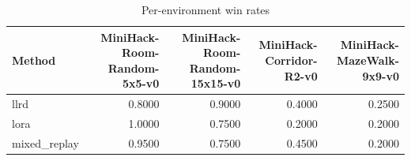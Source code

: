 \begin{table}[htbp]
\centering
\caption{Per-environment win rates}
\label{tab:per-env}
\begin{tabular}{lrrrr}
\toprule
\textbf{Method} & \textbf{MiniHack-Room-Random-5x5-v0} & \textbf{MiniHack-Room-Random-15x15-v0} & \textbf{MiniHack-Corridor-R2-v0} & \textbf{MiniHack-MazeWalk-9x9-v0} \\
\midrule
llrd & 0.8000 & 0.9000 & 0.4000 & 0.2500 \\
lora & 1.0000 & 0.7500 & 0.2000 & 0.2000 \\
mixed\_replay & 0.9500 & 0.7500 & 0.4500 & 0.2000 \\
\bottomrule
\end{tabular}
\end{table}